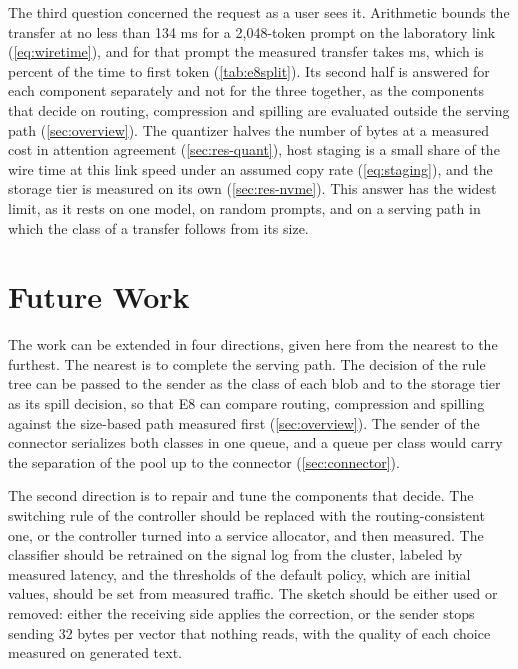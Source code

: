 The third question concerned the request as a user sees it. \emph{\rqthree}
Arithmetic bounds the transfer at no less than 134 ms for a 2,048-token prompt on the laboratory link
(\cref{eq:wiretime}), and for that prompt the measured transfer takes
\blank{} ms, which is \blank{} percent of the time to first token
(\cref{tab:e8split}).  Its second half is answered for
each component separately and not for the three together, as the components
that decide on routing, compression and spilling are evaluated outside the
serving path (\cref{sec:overview}). The quantizer halves the number of bytes
at a measured cost in attention agreement (\cref{sec:res-quant}), host
staging is a small share of the wire time at this link speed under an
assumed copy rate (\cref{eq:staging}), and the storage tier is measured on
its own (\cref{sec:res-nvme}). This answer has the widest limit, as it
rests on one model, on random prompts, and on a serving path in which the
class of a transfer follows from its size.

\section{Future Work}

The work can be extended in four directions, given here from the nearest to
the furthest. The nearest is to complete the serving path. The decision of the rule tree
can be passed to the sender as the class of each blob and to the storage
tier as its spill decision, so that E8 can compare routing, compression and
spilling against the size-based path measured first (\cref{sec:overview}).
The sender of the connector serializes both classes in one queue, and a
queue per class would carry the separation of the pool up to the connector
(\cref{sec:connector}).

The second direction is to repair and tune the components that decide. The
switching rule of the controller should be replaced with the
routing-consistent one, or the controller turned into a service allocator,
and then measured. The classifier should be retrained on the signal log from
the cluster, labeled by measured latency, and the thresholds of the default
policy, which are initial values, should be set from measured traffic. The
sketch should be either used or removed: either the receiving side applies
the correction, or the sender stops sending 32 bytes per vector that nothing
reads, with the quality of each choice measured on generated text.

